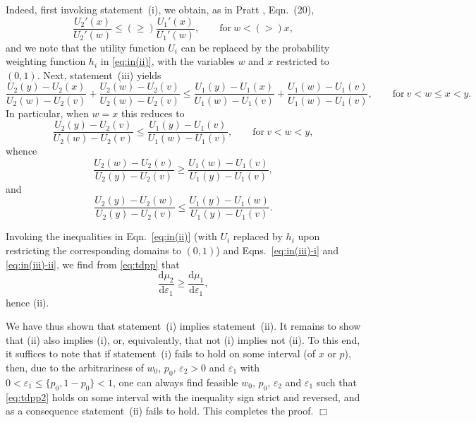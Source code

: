 \documentclass[11pt]{article}
\def\qed{\unskip\nobreak\hfill$\Box$\par\addvspace{\medskipamount}}
\begin{document}
\begin{appendices}
Indeed, first invoking statement~(i), we obtain, as in Pratt \cite{P64}, Eqn.~(20),
\begin{equation}
\frac{U_{2}'(x)}{U_{2}'(w)}\leq(\geq) \frac{U_{1}'(x)}{U_{1}'(w)},\qquad\mathrm{for}\ w<(>)x,
\label{eq:in(ii)}
\end{equation}
and we note that
the utility function $U_{i}$ can be replaced by the probability weighting function $h_{i}$
in \eqref{eq:in(ii)},
with the variables $w$ and $x$ 
restricted to $(0,1)$.
Next, statement~(iii) yields
\begin{equation*}
\frac{U_{2}(y)-U_{2}(x)}{U_{2}(w)-U_{2}(v)}+\frac{U_{2}(w)-U_{2}(v)}{U_{2}(w)-U_{2}(v)}
\leq \frac{U_{1}(y)-U_{1}(x)}{U_{1}(w)-U_{1}(v)}+\frac{U_{1}(w)-U_{1}(v)}{U_{1}(w)-U_{1}(v)},\qquad\mathrm{for}\ v<w\leq x<y.
\end{equation*}
In particular, when $w=x$ this reduces to
\begin{equation*}
\frac{U_{2}(y)-U_{2}(v)}{U_{2}(w)-U_{2}(v)}
\leq \frac{U_{1}(y)-U_{1}(v)}{U_{1}(w)-U_{1}(v)},\qquad\mathrm{for}\ v<w<y,
\end{equation*}
whence
\begin{equation}
\frac{U_{2}(w)-U_{2}(v)}{U_{2}(y)-U_{2}(v)}
\geq \frac{U_{1}(w)-U_{1}(v)}{U_{1}(y)-U_{1}(v)}, 
\label{eq:in(iii)-i}
\end{equation}
and
\begin{equation}
\frac{U_{2}(y)-U_{2}(w)}{U_{2}(y)-U_{2}(v)}
\leq \frac{U_{1}(y)-U_{1}(w)}{U_{1}(y)-U_{1}(v)}.
\label{eq:in(iii)-ii}
\end{equation}

Invoking the inequalities 
in Eqn.~\eqref{eq:in(ii)}
(with $U_{i}$ replaced by $h_{i}$ upon restricting the corresponding domains to $(0,1)$)
and Eqns.~\eqref{eq:in(iii)-i} and \eqref{eq:in(iii)-ii},
we find from \eqref{eq:tdpp} that
\begin{equation}
\frac{\mathrm{d}\mu_{2}}{\mathrm{d}\varepsilon_{1}}\geq \frac{\mathrm{d}\mu_{1}}{\mathrm{d}\varepsilon_{1}},
\label{eq:tdpp2}
\end{equation}
hence (ii).

We have thus shown that statement~(i) implies statement~(ii).
It remains to show that (ii) also implies (i),
or, equivalently, that not (i) implies not (ii).
To this end, it suffices to note that
if statement~(i) fails to hold on some interval (of $x$ or $p$),
then,
due to the arbitrariness of $w_{0}$, $p_{0}$, $\varepsilon_{2}>0$ and $\varepsilon_{1}$ with
$0<\varepsilon_{1}\leq\{p_{0},1-p_{0}\}<1$,
one can always find feasible $w_{0}$, $p_{0}$, $\varepsilon_{2}$ and $\varepsilon_{1}$ such that
\eqref{eq:tdpp2} 
holds on some interval with the inequality sign strict and reversed,
and as a consequence statement~(ii) fails to hold.
This completes the proof.
\qed



\end{appendices}
\end{document}
